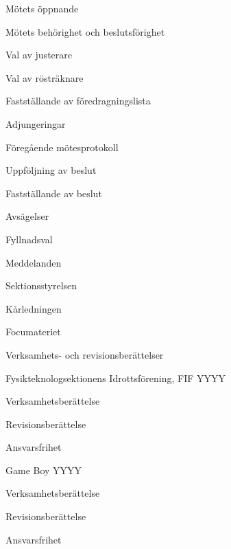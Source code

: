 \documentclass[prelim]{sektionsmote}
\begin{document}
\maketitle

\begin{ootd}

\item{Mötets öppnande}

\item{Mötets behörighet och beslutsförighet}

\item{Val av justerare}

\item{Val av rösträknare}

\item{Fastställande av föredragningslista}

\item{Adjungeringar}

\item{Föregående mötesprotokoll}

\item{Uppföljning av beslut}

\item{Fastställande av beslut}
\begin{ootd}
    \item Avsägelser
    \item Fyllnadsval
\end{ootd}

\item{Meddelanden}
\begin{ootd}
    \item Sektionsstyrelsen
    \item Kårledningen
    \item Focumateriet
\end{ootd}

\item{Verksamhets- och revisionsberättelser}
\begin{ootd}
  \item Fysikteknologsektionens Idrottsförening, FIF YYYY
  \begin{ootd}
    \item Verksamhetsberättelse
    \item Revisionsberättelse
    \item Ansvarsfrihet
  \end{ootd}
  \item Game Boy YYYY
  \begin{ootd}
    \item Verksamhetsberättelse
    \item Revisionsberättelse
    \item Ansvarsfrihet
  \end{ootd}
\end{ootd}


\end{ootd}
\end{document}
